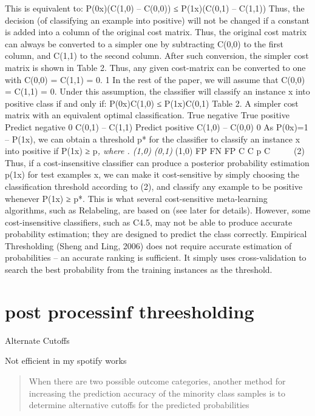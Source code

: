 \documentclass[
]{report}
\begin{document}
This is equivalent to:
P(0\textbar x)(C(1,0) -- C(0,0)) ≤ P(1\textbar x)(C(0,1) -- C(1,1))
Thus, the decision (of classifying an example into positive) will not be changed if a constant is
added into a column of the original cost matrix. Thus, the original cost matrix can always be
converted to a simpler one by subtracting C(0,0) to the first column, and C(1,1) to the second
column. After such conversion, the simpler cost matrix is shown in Table 2. Thus, any given
cost-matrix can be converted to one with C(0,0) = C(1,1) = 0. 1 In the rest of the paper, we will
assume that C(0,0) = C(1,1) = 0. Under this assumption, the classifier will classify an instance x
into positive class if and only if:
P(0\textbar x)C(1,0) ≤ P(1\textbar x)C(0,1)
Table 2. A simpler cost matrix with an equivalent optimal classification.
True negative True positive
Predict negative 0 C(0,1) -- C(1,1)
Predict positive C(1,0) -- C(0,0) 0
As P(0\textbar x)=1 -- P(1\textbar x), we can obtain a threshold p* for the classifier to classify an instance x into
positive if P(1\textbar x) ≥ p\emph{, where
.
(1,0) (0,1)
} (1,0)
FP FN
FP
C C
p C



 (2)
Thus, if a cost-insensitive classifier can produce a posterior probability estimation p(1\textbar x) for test
examples x, we can make it cost-sensitive by simply choosing the classification threshold
according to (2), and classify any example to be positive whenever P(1\textbar x) ≥ p*. This is what
several cost-sensitive meta-learning algorithms, such as Relabeling, are based on (see later for
details). However, some cost-insensitive classifiers, such as C4.5, may not be able to produce
accurate probability estimation; they are designed to predict the class correctly. Empirical
Thresholding (Sheng and Ling, 2006) does not require accurate estimation of probabilities -- an
accurate ranking is sufficient. It simply uses cross-validation to search the best probability from
the training instances as the threshold.

\hypertarget{post-processinf-threesholding}{%
\section{post processinf threesholding}\label{post-processinf-threesholding}}

Alternate Cutoffs

Not efficient in my spotify works

\begin{quote}
When there are two possible outcome categories, another method for increasing the prediction accuracy of the minority class samples is to determine alternative cutoﬀs for the predicted probabilities
\end{quote}
\end{document}
